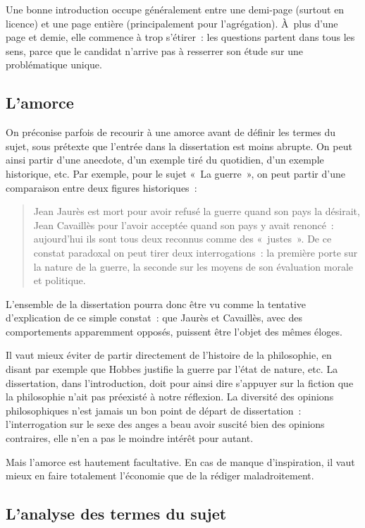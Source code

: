 \documentclass[a4paper,12pt]{article}
\begin{document}
Une bonne introduction occupe généralement entre une demi-page (surtout
en licence) et une page entière (principalement pour l'agrégation).
À plus d'une page et demie, elle commence à trop s'étirer : les
questions partent dans tous les sens, parce que le candidat n'arrive pas
à resserrer son étude sur une problématique unique.

\subsection{L'amorce}
\label{sec-2-1}

On préconise parfois de recourir à une amorce avant de définir les
termes du sujet, sous prétexte que l'entrée dans la dissertation est
moins abrupte. On peut ainsi partir d'une anecdote, d'un exemple tiré du
quotidien, d'un exemple historique, etc. Par exemple, pour le sujet « La
guerre », on peut partir d'une comparaison entre deux figures
historiques :

\begin{quote}
Jean Jaurès est mort pour avoir refusé la guerre quand son pays la
désirait, Jean Cavaillès pour l'avoir acceptée quand son pays y avait
renoncé : aujourd'hui ils sont tous deux reconnus comme des « justes ».
De ce constat paradoxal on peut tirer deux interrogations : la
première porte sur la nature de la guerre, la seconde sur les moyens
de son évaluation morale et politique.
\end{quote}

L'ensemble de la dissertation pourra donc être vu comme la tentative
d'explication de ce simple constat : que Jaurès et Cavaillès, avec des
comportements apparemment opposés, puissent être l'objet des mêmes
éloges.

Il vaut mieux éviter de partir directement de l'histoire de la
philosophie, en disant par exemple que Hobbes justifie la guerre par
l'état de nature, etc. La dissertation, dans l'introduction, doit pour
ainsi dire s'appuyer sur la fiction que la philosophie n'ait pas
préexisté à notre réflexion. La diversité des opinions philosophiques
n'est jamais un bon point de départ de dissertation : l'interrogation
sur le sexe des anges a beau avoir suscité bien des opinions contraires,
elle n'en a pas le moindre intérêt pour autant.

Mais l'amorce est hautement facultative. En cas de manque d'inspiration,
il vaut mieux en faire totalement l'économie que de la rédiger
maladroitement.

\subsection{L'analyse des termes du sujet}
\label{sec-2-2}
\end{document}

